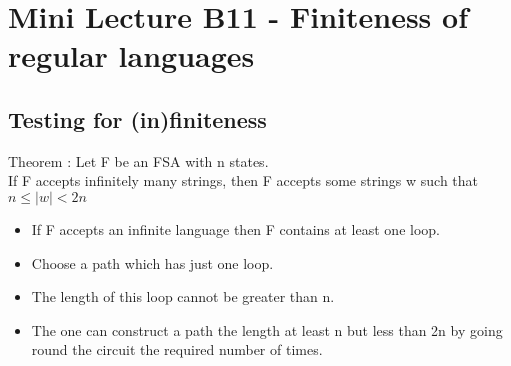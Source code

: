 \documentclass[11pt,twoside,a4paper]{article}
\begin{document}
\section{Mini Lecture B11 - Finiteness of regular languages}
\subsection{Testing for (in)finiteness}
Theorem : Let F be an FSA with n states.\\
If F accepts infinitely many strings, then F accepts some strings w such that $n\leq \left | w \right | < 2n$
\begin{itemize}
	\item If F accepts an infinite language then F contains at least one loop.
	\item Choose a path which has just one loop.
	\item The length of this loop cannot be greater than n.
	\item The one can construct a path the length at least n but less than 2n by going round the circuit the required number of times.
\end{itemize}
\end{document}
